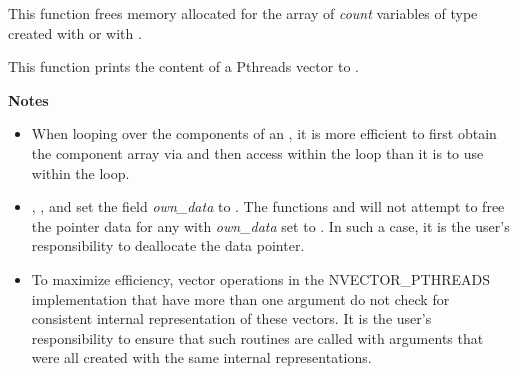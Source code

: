 \documentclass[letterpaper,10pt,english]{sphinxmanual}
\begin{document}

\begin{fulllineitems}
\label{nvectors/NVector_Pthreads:N_VDestroyVectorArray_Pthreads}
This function frees memory allocated for the array of \emph{count}
variables of type  created with
{\hyperref[nvectors/NVector_Pthreads:N_VCloneVectorArray_Pthreads]{}} or with
{\hyperref[nvectors/NVector_Pthreads:N_VCloneEmptyVectorArray_Pthreads]{}}.

\end{fulllineitems}


\begin{fulllineitems}
\label{nvectors/NVector_Pthreads:N_VPrint_Pthreads}
This function prints the content of a Pthreads vector to .

\end{fulllineitems}


\textbf{Notes}
\begin{itemize}
\item {} 
When looping over the components of an , it is more
efficient to first obtain the component array via  and then access  within the loop than it
is to use  within the loop.

\item {} 
{\hyperref[nvectors/NVector_Pthreads:N_VNewEmpty_Pthreads]{}}, {\hyperref[nvectors/NVector_Pthreads:N_VMake_Pthreads]{}}, and
{\hyperref[nvectors/NVector_Pthreads:N_VCloneEmptyVectorArray_Pthreads]{}} set the field \emph{own\_data}
to .  The functions  and
{\hyperref[nvectors/NVector_Pthreads:N_VDestroyVectorArray_Pthreads]{}} will not attempt to free the
pointer data for any  with \emph{own\_data} set to .
In such a case, it is the user's responsibility to deallocate the
data pointer.

\item {} 
To maximize efficiency, vector operations in the NVECTOR\_PTHREADS
implementation that have more than one  argument do not
check for consistent internal representation of these vectors. It is
the user's responsibility to ensure that such routines are called
with  arguments that were all created with the same
internal representations.

\end{itemize}
\end{document}
